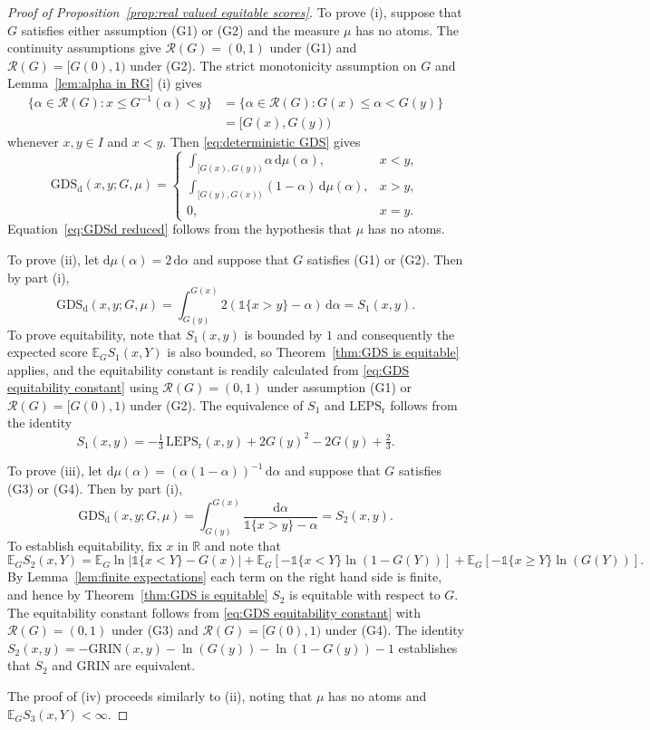\documentclass[10pt,a4paper]{amsart}
\newcommand{\EEE}{\mathbb{E}}
\newcommand{\GDSd}{\mathrm{GDS}_\mathrm{d}}
\newcommand{\Grin}{\mathrm{GRIN}}
\newcommand{\LEPSr}{\mathrm{LEPS}_\mathrm{r}}
\newcommand{\RG}{\mathcal{R}(G)}
\newcommand{\RRR}{\mathbb{R}}
\newcommand{\dd}{\mathrm{d}}
\newcommand{\one}{\mathds{1}}
\begin{document}
\begin{proof}[Proof of Proposition~\ref{prop:real valued equitable scores}]
To prove (i), suppose that $G$ satisfies either assumption (G1) or (G2) and the measure $\mu$ has no atoms. The continuity assumptions give $\RG=(0,1)$ under (G1) and $\RG=[G(0),1)$ under (G2). The strict monotonicity assumption on $G$ and Lemma~\ref{lem:alpha in RG} (i) gives
\begin{align*}
\{\alpha\in\RG:x\leq G^{-1}(\alpha)<y\}
&=\{\alpha\in\RG:G(x)\leq \alpha< G(y)\} \\
&=[G(x),G(y))
\end{align*}
whenever $x,y \in I$ and $x<y$. Then \eqref{eq:deterministic GDS} gives
\[
\GDSd(x,y;G,\mu)
=
\begin{cases}
\displaystyle\int_{[G(x),G(y))}  \alpha \,\dd\mu(\alpha), & x<y, \\
\displaystyle\int_{[G(y),G(x))} (1-\alpha) \,\dd\mu(\alpha), & x>y, \\
0, & x=y.
\end{cases}
\]
Equation~\eqref{eq:GDSd reduced} follows from the hypothesis that $\mu$ has no atoms.

To prove (ii), let $\dd\mu(\alpha)=2\,\dd\alpha$ and suppose that $G$ satisfies (G1) or (G2). Then by part (i),
\[
\GDSd(x,y;G,\mu)= \int_{G(y)}^{G(x)}2(\one\{x>y\} - \alpha)\,\dd\alpha = S_1(x,y).
\]
To prove equitability, note that $S_1(x,y)$ is bounded by $1$ and consequently the expected score $\EEE_G S_1(x,Y)$ is also bounded, so Theorem~\ref{thm:GDS is equitable} applies, and the equitability constant is readily calculated from \eqref{eq:GDS equitability constant} using $\RG=(0,1)$ under assumption (G1) or  $\RG=[G(0),1)$ under (G2). The equivalence of $S_1$ and $\LEPSr$ follows from the identity
\begin{equation}\label{eq:S1 LEPS equivalence}
S_1(x,y)=-\tfrac{1}{3}\,\LEPSr(x,y) + 2G(y)^2-2G(y)+\tfrac{2}{3}.
\end{equation}

To prove (iii), let $\dd\mu(\alpha)=(\alpha(1-\alpha))^{-1}\,\dd\alpha$ and suppose that $G$ satisfies (G3) or (G4). Then by part (i),
\[
\GDSd(x,y;G,\mu) = \int_{G(y)}^{G(x)} \frac{\dd\alpha}{\one\{x>y\} - \alpha} = S_2(x,y).
\]
To establish equitability, fix $x$ in $\RRR$ and note that
\begin{equation}\label{eq:S2 decomp}
\EEE_G S_2(x,Y)=\EEE_G \ln|\one\{x< Y\} - G(x)| + \EEE_G[-\one\{x< Y\}\ln(1-G(Y))] + \EEE_G[-\one\{x \geq Y\}\ln(G(Y))].
\end{equation}
By Lemma~\ref{lem:finite expectations} each term on the right hand side is finite, and hence by Theorem~\ref{thm:GDS is equitable} $S_2$ is equitable with respect to $G$. The equitability constant follows from \eqref{eq:GDS equitability constant} with $\RG=(0,1)$ under (G3) and $\RG=[G(0),1)$ under (G4). The identity $S_2(x,y)= -\Grin(x,y) - \ln(G(y)) - \ln(1-G(y)) - 1$ establishes that $S_2$ and $\Grin$ are equivalent.

The proof of (iv) proceeds similarly to (ii), noting that $\mu$ has no atoms and $\EEE_G S_3(x,Y)<\infty$.
\end{proof}
\end{document}
